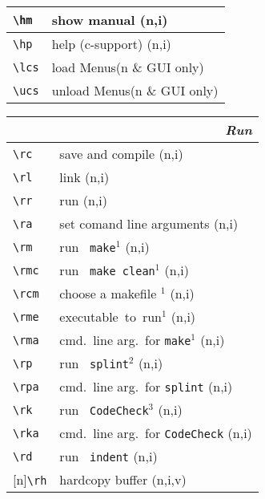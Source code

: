 \documentclass[oneside,11pt,landscape,DIV17]{scrartcl}
\newcommand{\Rep}{{\tiny{[n]}}}
\begin{document}
\begin{multicols}{3}
\begin{center}
\begin{tabular}[]{|p{12mm}|p{60mm}|}
\hline \verb'\hm'   & show manual   \hfill (n,i)\\
\hline \verb'\hp'   & help (c-support) \hfill (n,i)\\
\hline \verb'\lcs'  & load    Menus\hfill \scriptsize{(n \& GUI only)}\\
\hline \verb'\ucs'  & unload  Menus\hfill \scriptsize{(n \& GUI only)}\\
\hline 
\end{tabular}
\vspace{100mm}
\begin{tabular}[]{|p{12mm}|p{58mm}|}
\hline
\multicolumn{2}{|r|}{\textsl{\textbf{R}un}} \\
\hline \verb'\rc'  & save and compile                        \hfill (n,i)\\
\hline \verb'\rl'  & link                                    \hfill (n,i)\\
\hline \verb'\rr'  & run                                     \hfill (n,i)\\
\hline \verb'\ra'  & set comand line arguments               \hfill (n,i)\\
\hline \verb'\rm'  & run \texttt{ make}$^1$                      \hfill (n,i)\\
\hline \verb'\rmc' & run \texttt{ make clean}$^1$                \hfill (n,i)\\
\hline \verb'\rcm' & choose a makefile $^1$                \hfill (n,i)\\
\hline \verb'\rme' & executable\ to\ run$^1$                     \hfill (n,i)\\
\hline \verb'\rma' & cmd.\ line arg.\ for \texttt{make}$^1$      \hfill (n,i)\\
%
\hline \verb'\rp'  & run \texttt{ splint}$^2$     \hfill (n,i)\\
\hline \verb'\rpa' & cmd.\ line arg.\ for \texttt{splint}    \hfill (n,i)\\
%
\hline \verb'\rk'  & run \texttt{ CodeCheck}$^3$  \hfill (n,i)\\
\hline \verb'\rka' & cmd.\ line arg.\ for \texttt{CodeCheck} \hfill (n,i)\\
%
\hline \verb'\rd'  & run \texttt{ indent}         \hfill (n,i)\\
\hline \Rep\verb'\rh'  & hardcopy buffer             \hfill (n,i,v)\\

\end{tabular}
\end{center}
\end{multicols}
\end{document}
